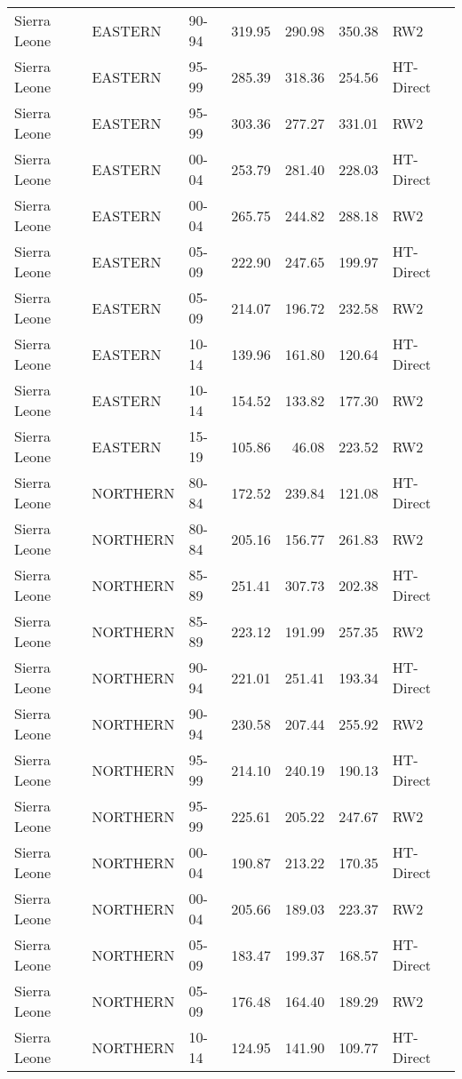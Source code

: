 \begin{longtable}{lllrrrl}
  Sierra Leone & EASTERN & 90-94 & 319.95 & 290.98 & 350.38 & RW2 \\ 
  Sierra Leone & EASTERN & 95-99 & 285.39 & 318.36 & 254.56 & HT-Direct \\ 
  Sierra Leone & EASTERN & 95-99 & 303.36 & 277.27 & 331.01 & RW2 \\ 
  Sierra Leone & EASTERN & 00-04 & 253.79 & 281.40 & 228.03 & HT-Direct \\ 
  Sierra Leone & EASTERN & 00-04 & 265.75 & 244.82 & 288.18 & RW2 \\ 
  Sierra Leone & EASTERN & 05-09 & 222.90 & 247.65 & 199.97 & HT-Direct \\ 
  Sierra Leone & EASTERN & 05-09 & 214.07 & 196.72 & 232.58 & RW2 \\ 
  Sierra Leone & EASTERN & 10-14 & 139.96 & 161.80 & 120.64 & HT-Direct \\ 
  Sierra Leone & EASTERN & 10-14 & 154.52 & 133.82 & 177.30 & RW2 \\ 
  Sierra Leone & EASTERN & 15-19 & 105.86 & 46.08 & 223.52 & RW2 \\ 
  Sierra Leone & NORTHERN & 80-84 & 172.52 & 239.84 & 121.08 & HT-Direct \\ 
  Sierra Leone & NORTHERN & 80-84 & 205.16 & 156.77 & 261.83 & RW2 \\ 
  Sierra Leone & NORTHERN & 85-89 & 251.41 & 307.73 & 202.38 & HT-Direct \\ 
  Sierra Leone & NORTHERN & 85-89 & 223.12 & 191.99 & 257.35 & RW2 \\ 
  Sierra Leone & NORTHERN & 90-94 & 221.01 & 251.41 & 193.34 & HT-Direct \\ 
  Sierra Leone & NORTHERN & 90-94 & 230.58 & 207.44 & 255.92 & RW2 \\ 
  Sierra Leone & NORTHERN & 95-99 & 214.10 & 240.19 & 190.13 & HT-Direct \\ 
  Sierra Leone & NORTHERN & 95-99 & 225.61 & 205.22 & 247.67 & RW2 \\ 
  Sierra Leone & NORTHERN & 00-04 & 190.87 & 213.22 & 170.35 & HT-Direct \\ 
  Sierra Leone & NORTHERN & 00-04 & 205.66 & 189.03 & 223.37 & RW2 \\ 
  Sierra Leone & NORTHERN & 05-09 & 183.47 & 199.37 & 168.57 & HT-Direct \\ 
  Sierra Leone & NORTHERN & 05-09 & 176.48 & 164.40 & 189.29 & RW2 \\ 
  Sierra Leone & NORTHERN & 10-14 & 124.95 & 141.90 & 109.77 & HT-Direct \\ 

\end{longtable}
